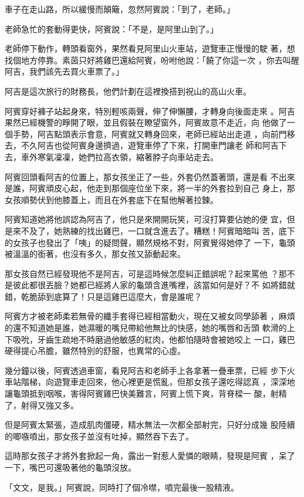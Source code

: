 車子在走山路，所以緩慢而顛簸，忽然阿賓說：「到了，老師。」

老師急忙的套動得更快，阿賓說：「不是，是阿里山到了。」

老師停下動作，轉頭看窗外，果然看見阿里山火車站，遊覽車正慢慢的駛
著，想找個地方停靠。素茵只好將雞巴還給阿賓，吩咐他說：「饒了你這一次
，你去叫醒阿吉，我們該先去買火車票了。」

阿吉是這次旅行的財務長，他們計劃在這裡換搭到祝山的高山火車。

阿賓穿好褲子站起身來，特別輕咳兩聲，伸了伸懶腰，才轉身向後面走來
。阿吉果然已經機警的睜開了眼，並且假裝在瞭望窗外，阿賓故意不走近，向
他做了一個手勢，阿吉點頭表示會意，阿賓就又轉身回來，老師已經站出走道
，向前門移去，不久阿吉也從阿賓身邊擠過，遊覽車停了下來，打開車門讓老
師和阿吉下去，車外寒氣凜凜，她們拉高衣領，縮著脖子向車站走去。

阿賓回頭看阿吉的位置上，那女孩坐正了一些，外套仍然蓋著頭，還是看
不出來是誰，阿賓頑皮心起，他走到那個座位坐下來，將一半的外套拉到自己
身上，那女孩順勢伏到他膝蓋上，而且在外套底下在幫他解著拉鍊。

阿賓知道她將他誤認為阿吉了，他只是來開開玩笑，可沒打算要佔她的便
宜，但是來不及了，她熟練的找出雞巴，一口就含進去了。糟糕！阿賓暗暗叫
苦，底下的女孩子也發出了「咦」的疑問聲，顯然規格不對，阿賓覺得她停了
一下，龜頭被溫溫的銜著，也沒有多久，那女孩又舔動起來。

那女孩自然已經發現他不是阿吉，可是這時候怎麼糾正錯誤呢？起來罵他
？那不是彼此都很丟臉？她都已經將人家的龜頭含進嘴裡，該當如何是好？不
如將錯就錯，乾脆舔到底算了！只是這雞巴這麼大，會是誰呢？

阿賓方才被老師柔若無骨的纖手套得已經相當動火，現在又被女同學舔著
，麻煩的還不知道她是誰，她濕暖的嘴兒帶給他無比的快感，她的嘴唇和舌頭
軟滑的上下吸吮，牙齒生疏地不時磨過他敏感的紅肉，他都怕隨時會被她咬上
一口，雞巴硬得提心吊膽，雖然特別的舒服，也異常的心虛。

幾分鐘以後，阿賓透過車窗，看見阿吉和老師手上各拿著一疊車票，已經
步下火車站階梯，向遊覽車走回來，他心裡更是慌亂，但那女孩子還吃得認真
，深深地讓龜頭抵到咽喉，害得阿賓雞巴快美難言，阿賓上慌下爽，背脊樑一
酸，射精了，射得又強又多。

但是阿賓太緊張，造成肌肉僵硬，精水無法一次都全部射完，只好分成幾
股陸續的唧嗾噴出，那女孩子並沒有吐掉，顯然吞下去了。

這時那女孩子才將外套掀起一角，露出一對惹人愛憐的眼睛，發現是阿賓
，呆了一下，嘴巴可還吸著他的龜頭沒放。

「文文，是我。」阿賓說，同時打了個冷噤，噴完最後一股精液。

